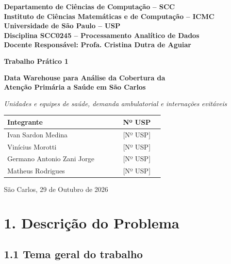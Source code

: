 \documentclass[12pt,a4paper]{article}
\renewcommand{\arraystretch}{1.25}
\begin{document}
\begin{titlepage}\thispagestyle{capa}\centering{}
\vspace*{10pt}
{\bfseries Departamento de Ciências de Computação – SCC\\
Instituto de Ciências Matemáticas e de Computação – ICMC\\
Universidade de São Paulo – USP\\
Disciplina SCC0245 – Processamento Analítico de Dados\\[10pt]
Docente Responsável: Profa. Cristina Dutra de Aguiar\par}
\vspace{60pt}
{\bfseries\fontsize{13}{16}\selectfont Trabalho Prático 1\par}\vspace{10pt}
{\color{azul}\bfseries\fontsize{18}{22}\selectfont Data Warehouse para Análise da Cobertura da\\ Atenção Primária a Saúde em São Carlos\par}\vspace{8pt}
{\itshape Unidades e equipes de saúde, demanda ambulatorial e internações evitáveis\par}
\vspace{60pt}
{\renewcommand{\arraystretch}{1.5}
\begin{tabular}{|p{0.62\linewidth}|p{0.22\linewidth}|}\hline
\rowcolor[HTML]{E8EDF5}\textbf{Integrante} & \textbf{Nº USP} \\ \hline
Ivan Sardon Medina & [Nº USP] \\ \hline
Vinícius Morotti & [Nº USP] \\ \hline
Germano Antonio Zani Jorge & [Nº USP] \\ \hline
Matheus Rodrigues & [Nº USP] \\ \hline
\end{tabular}\par}
\vfill
São Carlos, 29 de Outubro de 2026\par
\vspace{30pt}
\end{titlepage}
\setcounter{page}{2}\tableofcontents\clearpage

\FloatBarrier\section*{1. Descrição do Problema}

\FloatBarrier\subsection*{1.1 Tema geral do trabalho}
\end{document}
